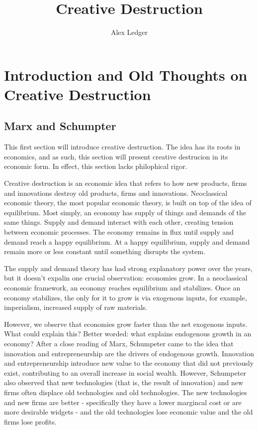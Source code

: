 \documentclass[11pt]{article}
\title{Creative Destruction}
\author{Alex Ledger}
\begin{document}
\maketitle

\section{Introduction and Old Thoughts on Creative Destruction}
\subsection{Marx and Schumpter}
This first section will introduce creative destruction.
The idea has its roots in economics, and as such, this section will present creative destrucion in its economic form.
In effect, this section lacks philophical rigor.

Creative destruction is an economic idea that refers to how new products, firms and innovations destroy old products, firms and innovations.
Neoclassical economic theory, the most popular economic theory, is built on top of the idea of equilibrium.
Most simply, an economy has supply of things and demands of the same things. 
Supply and demand interact with each other, creating tension between economic processes.
The economy remains in flux until supply and demand reach a happy equilibrium.
At a happy equilibrium, supply and demand remain more or less constant until something disrupts the system.

The supply and demand theory has had strong explanatory power over the years, but it doesn't expalin one crucial observation: economies grow.
In a neoclassical economic framework, an economy reaches equilibrium and stabilizes.
Once an economy stabilizes, the only for it to grow is via exogenous inputs, for example, imperialism, increased supply of raw materials.

However, we observe that economies grow faster than the net exogenous inputs.
What could explain this?
Better worded: what explains endogenous growth in an economy?
After a close reading of Marx, Schumpeter came to the idea that innovation and entrepreneurship are the drivers of endogenous growth.
Innovation and entrepreneurship introduce new value to the economy that did not previously exist, contributing to an overall increase in social wealth.
However, Schumpeter also observed that new technologies (that is, the result of innovation)  and new firms often displace old technologies and old technologies.
The new technologies and new firms are better - specifically they have a lower margincal cost or are more desirable widgets - and the old technologies lose economic value and the old firms lose profits.
\end{document}
